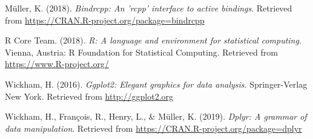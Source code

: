 \documentclass[man,floatsintext]{apa6}
\begin{document}
\hypertarget{ref-R-bindrcpp}{}
Müller, K. (2018). \emph{Bindrcpp: An 'rcpp' interface to active
bindings}. Retrieved from
\url{https://CRAN.R-project.org/package=bindrcpp}

\hypertarget{ref-R-base}{}
R Core Team. (2018). \emph{R: A language and environment for statistical
computing}. Vienna, Austria: R Foundation for Statistical Computing.
Retrieved from \url{https://www.R-project.org/}

\hypertarget{ref-R-ggplot2}{}
Wickham, H. (2016). \emph{Ggplot2: Elegant graphics for data analysis}.
Springer-Verlag New York. Retrieved from \url{http://ggplot2.org}

\hypertarget{ref-R-dplyr}{}
Wickham, H., François, R., Henry, L., \& Müller, K. (2019). \emph{Dplyr:
A grammar of data manipulation}. Retrieved from
\url{https://CRAN.R-project.org/package=dplyr}

\endgroup
\end{document}
